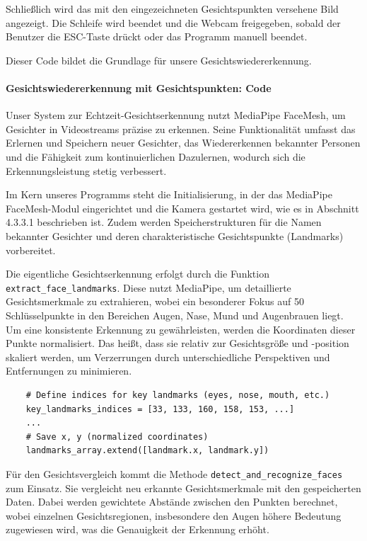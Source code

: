 Schließlich wird das mit den eingezeichneten Gesichtspunkten versehene Bild angezeigt. Die Schleife wird beendet und die Webcam freigegeben, sobald der Benutzer die ESC-Taste drückt oder das Programm manuell beendet.

Dieser Code bildet die Grundlage für unsere Gesichtswiedererkennung.

\paragraph{Gesichtswiedererkennung mit Gesichtspunkten: Code} 

Unser System zur Echtzeit-Gesichtserkennung nutzt MediaPipe FaceMesh, um Gesichter in Videostreams präzise zu erkennen.
Seine Funktionalität umfasst das Erlernen und Speichern neuer Gesichter, das Wiedererkennen bekannter Personen und die Fähigkeit zum kontinuierlichen Dazulernen, wodurch sich die Erkennungsleistung stetig verbessert.

Im Kern unseres Programms steht die Initialisierung, in der das MediaPipe FaceMesh-Modul eingerichtet und die Kamera gestartet wird, wie es in Abschnitt 4.3.3.1 beschrieben ist.
Zudem werden Speicherstrukturen für die Namen bekannter Gesichter und deren charakteristische Gesichtspunkte (Landmarks) vorbereitet.

Die eigentliche Gesichtserkennung erfolgt durch die Funktion \texttt{extract\_face\_landmarks}. Diese nutzt MediaPipe, um detaillierte Gesichtsmerkmale zu extrahieren, wobei ein besonderer Fokus auf 50 Schlüsselpunkte in den Bereichen Augen, Nase, Mund und Augenbrauen liegt.
Um eine konsistente Erkennung zu gewährleisten, werden die Koordinaten dieser Punkte normalisiert. Das heißt, dass sie relativ zur Gesichtsgröße und -position skaliert werden, um Verzerrungen durch unterschiedliche Perspektiven und Entfernungen zu minimieren.
\begin{lstlisting}
    # Define indices for key landmarks (eyes, nose, mouth, etc.)
    key_landmarks_indices = [33, 133, 160, 158, 153, ...] 
    ...
    # Save x, y (normalized coordinates)
    landmarks_array.extend([landmark.x, landmark.y]) 
\end{lstlisting}

Für den Gesichtsvergleich kommt die Methode \texttt{detect\_and\_recognize\_faces} zum Einsatz. Sie vergleicht neu erkannte Gesichtsmerkmale mit den gespeicherten Daten.
Dabei werden gewichtete Abstände zwischen den Punkten berechnet, wobei einzelnen Gesichtsregionen, insbesondere den Augen höhere Bedeutung zugewiesen wird, was die Genauigkeit der Erkennung erhöht.

